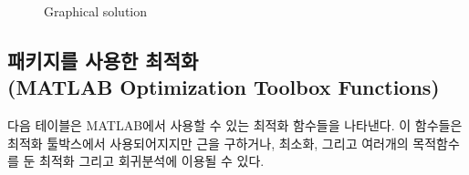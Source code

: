 \begin{figure}[!hbpt]
\caption{Graphical solution}
\label{fig:10-2}
\end{figure}
\clearpage
\subsection{패키지를 사용한 최적화\\(MATLAB Optimization Toolbox Functions)}\label{sec:optoolbox}
다음 테이블은 MATLAB에서 사용할 수 있는 최적화 함수들을 나타낸다. 이 함수들은 최적화 툴박스에서 사용되어지지만 근을 구하거나, 최소화, 그리고 여러개의 목적함수를 둔 최적화 그리고 회귀분석에 이용될 수 있다.
